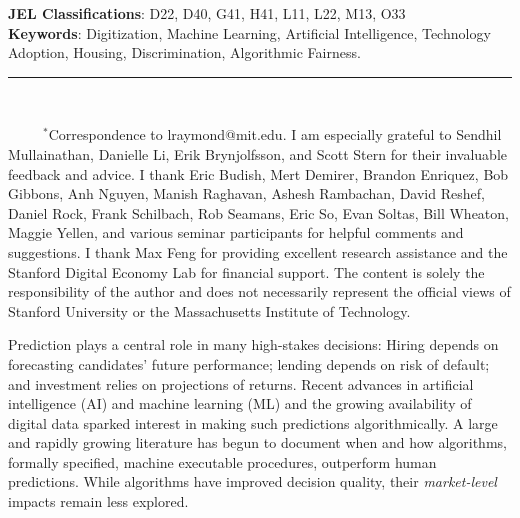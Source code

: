 \documentclass[11pt]{article}
\begin{document}
\indent \textbf{JEL Classifications}:  D22, D40, G41, H41, L11, L22, M13, O33 \\
\indent \textbf{Keywords}: Digitization, Machine Learning, Artificial Intelligence, Technology Adoption, Housing, Discrimination, Algorithmic Fairness.

\bigskip


\hspace{-25pt}\rule[0.1ex]{0.33\textwidth}{0.2mm}\vspace{0.05in}\\\indent
\begin{singlespace}
\vspace{-25pt}
\noindent \scriptsize{\mbox{  }\mbox{  }\mbox{  }\mbox{  }\mbox{ }$^{*}$Correspondence to lraymond@mit.edu. 
I am especially grateful to Sendhil Mullainathan, Danielle Li, Erik Brynjolfsson, and Scott Stern for their invaluable feedback and advice. I thank Eric Budish, Mert Demirer, Brandon Enriquez, Bob Gibbons, Anh Nguyen, Manish Raghavan, Ashesh Rambachan, David Reshef, Daniel Rock, Frank Schilbach, Rob Seamans, Eric So, Evan Soltas, Bill Wheaton, Maggie Yellen, and various seminar participants for helpful comments and suggestions. I thank Max Feng for providing excellent research assistance and the Stanford Digital Economy Lab for financial support. The content is solely the responsibility of the author and does not necessarily represent the official views of Stanford University or the Massachusetts Institute of Technology.}
\end{singlespace}


\thispagestyle{empty}

 \setcounter{page}{0}

\clearpage

\newpage




Prediction plays a central role in many high-stakes decisions: Hiring depends on forecasting candidates' future performance; lending depends on risk of default; and investment relies on projections of returns. Recent advances in artificial intelligence (AI) and machine learning (ML) and the growing availability of digital data sparked interest in making such predictions algorithmically. A large and rapidly growing literature has begun to document when and how algorithms, formally specified, machine executable procedures, outperform human predictions. While algorithms have improved decision quality, their \textit{market-level} impacts remain less explored.
\end{document}
